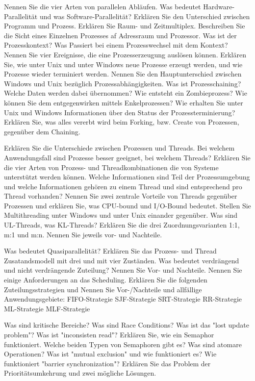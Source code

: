 \documentclass[ngerman,a4paper,12pt]{scrreprt}
\begin{document}
\olR
	\li Nennen Sie die vier Arten von parallelen Abläufen. Was bedeutet Hardware-Parallelität und was Software-Parallelität?
	\li Erklären Sie den Unterschied zwischen Programm und Prozess.
	\li Erklären Sie Raum- und Zeitmultiplex. Beschreiben Sie die Sicht eines Einzelnen Prozesses af Adressraum und Prozessor.
	\li Was ist der Prozesskontext? Was Passiert bei einem Prozesswechsel mit dem Kontext?
	\li Nennen Sie vier Ereignisse, die eine Prozesserzeugung auslösen können.
	\li Erklären Sie, wie unter Unix und unter Windows neue Prozesse erzeugt werden, und wie Prozesse wieder terminiert werden. Nennen Sie den Hauptunterschied zwischen Windows und Unix bezüglich Prozessabhängigkeiten.
	\li Was ist Prozesschaining? Welche Daten werden dabei übernommen?
	\li Wie entsteht ein Zombieprozess? Wie können Sie dem entgegenwirken mittels Enkelprozessen?
	\li Wie erhalten Sie unter Unix und Windows Informationen über den Status der Prozessterminierung?
	\li Erklären Sie, was alles vererbt wird beim Forking, bzw. Create von Prozessen, gegenüber dem Chaining. 
	\li 
\olS


\olR
	\li Erklären Sie die Unterschiede zwischen Prozessen und Threads. Bei welchem Anwendungsfall sind Prozesse besser geeignet, bei welchem Threads?
	\li Erklären Sie die vier Arten von Prozess- und Threadkombinationen die von Systeme unterstützt werden können. 
	\li Welche Informationen sind Teil der Prozessumgebung und welche Informationen gehören zu einem Thread und sind entsprechend pro Thread vorhanden?
	\li Nennen Sie zwei zentrale Vorteile von Threads gegenüber Prozessen und erklären Sie, was CPU-bound und I/O-Bound bedeutet.
	\li Stellen Sie Multithreading unter Windows und unter Unix einander gegenüber.
	\li Was sind UL-Threads, was KL-Threads? Erklären Sie die drei Zuordnungsvarianten 1:1, m:1 und m:n. Nennen Sie jeweils vor- und Nachteile.
\olS


\olR
	\li Was bedeutet Quasiparallelität?
	\li Erklären Sie das Prozess- und Thread Zusatandsmodell mit drei und mit vier Zuständen.
	\li Was bedeutet verdrängend und nicht verdrängende Zuteilung? Nennen Sie Vor- und Nachteile.
	\li Nennen Sie einige Anforderungen an das Scheduling.
	\li Erklären Sie die folgenden Zuteilungsstrategien und Nennen Sie Vor-/Nachteile und allfällige Anwendungsgebiete:
		\ul
			\li FIFO-Strategie
			\li SJF-Strategie
			\li SRT-Strategie
			\li RR-Strategie
			\li ML-Strategie
			\li MLF-Strategie
		\ulE
\olS


\olR
	\li Was sind kritische Bereiche? Was sind Race Conditions?
	\li Was ist das "lost update problem"?
	\li Was ist "inconsisten read"?
	\li Erklären Sie, wie ein Semaphor funktioniert. Welche beiden Typen von Semaphoren gibt es?
	\li Was sind atomare Operationen?
	\li Was ist "mutual exclusion" und wie funktioniert es?
	\li Wie funktioniert "barrier synchronization"?
	\li Erklären Sie das Problem der Prioritätsumkehrung und zwei mögliche Lösungen.	
\olS
\end{document}
